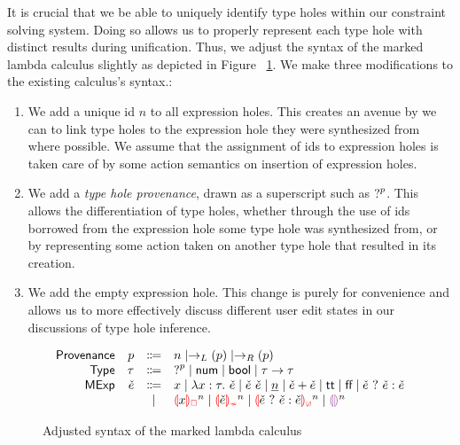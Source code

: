 \label{sec:typinf}
It is crucial that we be able to uniquely identify type holes within our constraint solving system. Doing so allows us to properly represent each type hole with distinct results during unification. Thus, we adjust the syntax of the marked lambda calculus slightly as depicted in Figure ~\ref{fig:adjusted-calculus-syntax}. We make three modifications to the existing calculus's syntax.:
\begin{enumerate}
    \item We add a unique id $n$ to all expression holes. This creates an avenue by we can to link type holes to the expression hole they were synthesized from where possible. We assume that the assignment of ids to expression holes is taken care of by some action semantics on insertion of expression holes. 
    \item We add a \emph{type hole provenance}, drawn as a superscript such as $\mathtt{?}^p$. This allows the differentiation of type holes, whether through the use of ids borrowed from the expression hole some type hole was synthesized from, or by representing some action taken on another type hole that resulted in its creation.
    \item We add the empty expression hole. This change is purely for convenience and allows us to more effectively discuss different user edit states in our discussions of type hole inference.
\end{enumerate}

\begin{figure}[htbp]
  \[\begin{array}{rrcl}
    \Prov & \Provp & \Coloneqq & n \mid \rightarrow_L(\Provp) \mid \rightarrow_R(\Provp) \\
    \TMName  & \TMV  & \Coloneqq & \TUnknown^{p} \mid \TNum \mid \TBool \mid \TArrow{\TMV}{\TMV} \\
    \ECMName & \ECMV & \Coloneqq & x \mid \ECLam{x}{\TMV}{\ECMV} \mid \ECAp{\ECMV}{\ECMV}
                       \mid           \ECNumMV \mid \ECPlus{\ECMV}{\ECMV}
                       \mid           \ECTrue \mid \ECFalse \mid \ECIf{\ECMV}{\ECMV}{\ECMV} \\
             &       & \mid         & \ECUnbound{x}^n \mid \ECInconType{\ECMV}^n \mid \ECInconBr{\ECMV}{\ECMV}{\ECMV}^n \mid \EEHole^n
  \end{array}\]
  \caption{Adjusted syntax of the marked lambda calculus}
  \label{fig:adjusted-calculus-syntax}
\end{figure}

